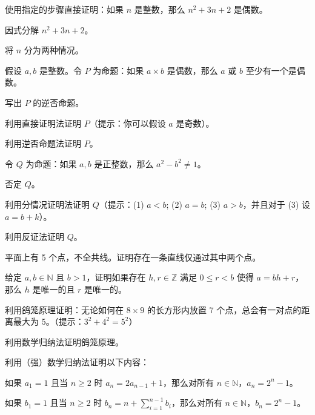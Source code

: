 \begin{problemset}
    \item 使用指定的步骤直接证明：如果 $n$ 是整数，那么 $n^2 + 3n + 2$ 是偶数。
    \begin{probenumerate}
        \item 因式分解 $n^2 + 3n + 2$。
        \item 将 $n$ 分为两种情况。
    \end{probenumerate}

    \item 假设 $a, b$ 是整数。令 $P$ 为命题：如果 $a \times b$ 是偶数，那么 $a$ 或 $b$ 至少有一个是偶数。
    \begin{probenumerate}
        \item 写出 $P$ 的逆否命题。
        \item 利用直接证明法证明 $P$（提示：你可以假设 $a$ 是奇数）。
        \item 利用逆否命题法证明 $P$。
    \end{probenumerate}

    \item 令 $Q$ 为命题：如果 $a, b$ 是正整数，那么 $a^2 - b^2 \neq 1$。
    \begin{probenumerate}
        \item 否定 $Q$。
        \item 利用分情况证明法证明 $Q$（提示：(1) $a < b$; (2) $a = b$; (3) $a > b$，并且对于 (3) 设 $a = b + k$）。
        \item 利用反证法证明 $Q$。
    \end{probenumerate}

    \item 平面上有 5 个点，不全共线。证明存在一条直线仅通过其中两个点。

    \item 给定 $a, b \in \mathbb{N}$ 且 $b > 1$，证明如果存在 $h, r \in \mathbb{Z}$ 满足 $0 \leq r < b$ 使得 $a = bh + r$，那么 $h$ 是唯一的且 $r$ 是唯一的。

    \item 利用鸽笼原理证明：无论如何在 $8 \times 9$ 的长方形内放置 7 个点，总会有一对点的距离最大为 5。（提示：$3^2 + 4^2 = 5^2$）

    \item 利用数学归纳法证明鸽笼原理。

    \item 利用（强）数学归纳法证明以下内容：
    \begin{probenumerate}
        \item 如果 $a_1 = 1$ 且当 $n \geq 2$ 时 $a_n = 2a_{n-1} + 1$，那么对所有 $n \in \mathbb{N}$，$a_n = 2^n - 1$。
        \item 如果 $b_1 = 1$ 且当 $n \geq 2$ 时 $b_n = n + \sum_{i=1}^{n-1} b_i$，那么对所有 $n \in \mathbb{N}$，$b_n = 2^n - 1$。
    \end{probenumerate}
\end{problemset}

